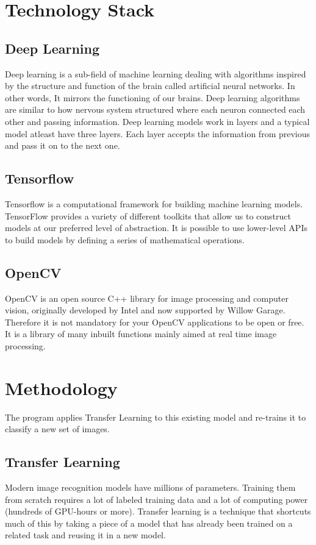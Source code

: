 \section{Technology Stack}
\subsection {Deep Learning} Deep learning is a sub-field of machine learning dealing with algorithms inspired by the structure and function of the brain called artificial neural networks. In other words, It mirrors the functioning of our brains. Deep learning algorithms are similar to how nervous system structured where each neuron connected each other and passing information. Deep learning models work in layers and a typical model atleast have three layers. Each layer accepts the information from previous and pass it on to the next one.

\subsection{Tensorflow}Tensorflow is a computational framework for building machine learning models. TensorFlow provides a variety of different toolkits that allow us to construct models at our preferred level of
abstraction. It is possible to use lower-level APIs to build models by defining a series of mathematical operations.
\subsection{OpenCV} OpenCV is an open source C++ library for image
processing and computer vision, originally developed by Intel and now
supported by Willow Garage. Therefore it is not mandatory for your
OpenCV applications to be open or free. It is a library of many inbuilt
functions mainly aimed at real time image processing.

\section{Methodology}
The program applies Transfer Learning to this existing model and re-trains it to classify a new set of images.

\subsection{Transfer Learning}
Modern image recognition models have millions of parameters. Training
them from scratch requires a lot of labeled training data and a lot of
computing power (hundreds of GPU-hours or more). Transfer learning is a
technique that shortcuts much of this by taking a piece of a model that has
already been trained on a related task and reusing it in a new model.

